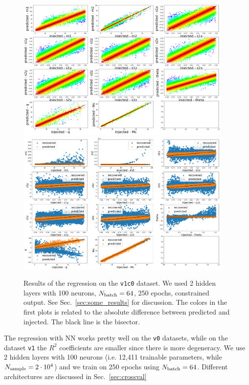 \documentclass[prd,aps,twocolumn,a4paper,showkeys,nofootinbib]{article}
\begin{document}
\begin{figure}[]
  \center
  \includegraphics[width=0.95\textwidth]{./Figs/v1c0_regression.png}
  \includegraphics[width=0.95\textwidth]{./Figs/v1c0_regression_noise.png}
  \caption{\label{fig:v1c0_results} Results of the regression on the \texttt{v1c0}
  dataset. We used 2 hidden layers with 100 neurons, $N_{\rm batch}=64$, 250 epochs,  
  constrained output. See Sec.~\ref{sec:some_results} for discussion.
  The colors in the first plots is related to the absolute difference between predicted 
  and injected. The black line is the bisector.}
\end{figure}
%
The regression with NN works pretty well on the \texttt{v0} datasets, while on 
the dataset \texttt{v1} the $R^2$ coefficients are smaller since there is more degeneracy.
We use 2 hidden layers with 100 neurons (i.e. 12,411 trainable parameters, while
$N_{\rm sample}=2\cdot 10^4$) and we train on 250 epochs using 
$N_{\rm batch}=64$. Different architectures are discussed in Sec.~\ref{sec:crossval}
\end{document}
